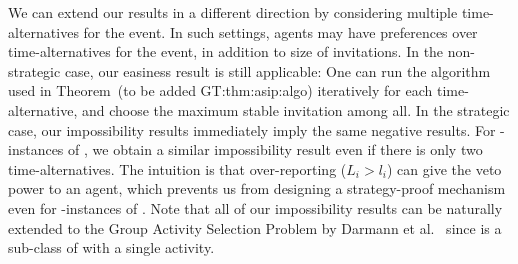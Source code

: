 We can extend our results in a different direction by considering multiple time-alternatives for the event. In such settings, agents may have preferences over time-alternatives for the event, in addition to size of invitations.   
In the non-strategic case, our easiness result is still applicable: One can run the algorithm used in Theorem~(to be added  GT:thm:asip:algo) iteratively for each time-alternative, and choose the maximum stable invitation among all.
In the strategic case, our impossibility results immediately imply the same negative results. 
For \INC-instances of \ASIP, we obtain a similar impossibility result even if there is only two time-alternatives. The intuition is that over-reporting ($L_i > l_i$) can give the veto power to an agent, which prevents us from designing a strategy-proof mechanism even for \INC-instances of \ASIP. Note that all of our impossibility results can be naturally extended to the Group Activity Selection Problem by Darmann et al.~\cite{GASP12WINE} since \ASIPs is a sub-class of \GASPs with a single activity.
